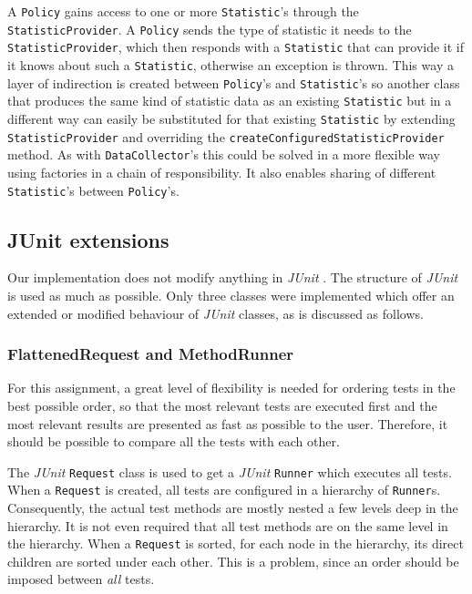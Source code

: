\documentclass[i2]{oss}
\newcommand{\class}[1]{\texttt{#1}}
\newcommand{\method}[1]{\texttt{#1}}
\newcommand{\junit}{\emph{JUnit }}
\begin{document}
A \class{Policy} gains access to one or more \class{Statistic}'s through
the \class{StatisticProvider}.
A \class{Policy} sends the type of statistic it needs to the 
\class{StatisticProvider}, which then responds with a \class{Statistic}
that can provide it if it knows about such a \class{Statistic}, otherwise
an exception is thrown.
This way a layer of indirection is created between \class{Policy}'s and
\class{Statistic}'s so another class that produces the same kind of 
statistic data as an existing \class{Statistic} but in a different way 
can easily be substituted for that existing \class{Statistic} by 
extending \class{StatisticProvider} and overriding the 
\method{createConfiguredStatisticProvider} method.
As with \class{DataCollector}'s this could be solved in a more flexible
way using factories in a chain of responsibility.
It also enables sharing of different \class{Statistic}'s between 
\class{Policy}'s. \\


\subsection{JUnit extensions}
\label{subssec:JUnit extensions}

Our implementation does not modify anything in \junit.
The structure of \junit is used as much as possible.
Only three classes were implemented which offer an extended or modified behaviour of \junit classes, as is discussed as follows.

\subsubsection{FlattenedRequest and MethodRunner}

For this assignment, a great level of flexibility is needed for ordering tests in the best possible order, so that the most relevant tests are executed first and the most relevant results are presented as fast as possible to the user.
Therefore, it should be possible to compare all the tests with each other.

The \junit \class{Request} class is used to get a \junit \class{Runner} which executes all tests.
When a \class{Request} is created, all tests are configured in a hierarchy of \class{Runner}s.
Consequently, the actual test methods are mostly nested a few levels deep in the hierarchy.
It is not even required that all test methods are on the same level in the hierarchy.
When a \class{Request} is sorted, for each node in the hierarchy, its direct children are sorted under each other.
This is a problem, since an order should be imposed between \emph{all} tests.
\end{document}
